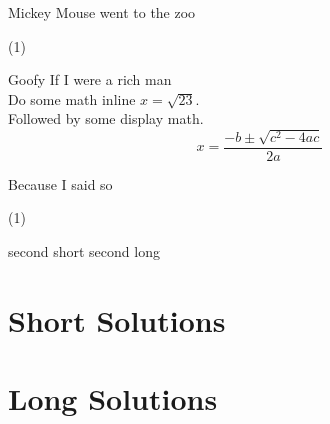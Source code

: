 \documentclass{article}
\makeatletter
\newif\ifshortsolution
\newcommand\shortlongsolution[2]{%
  \ifshortsolution
    \expandafter\@firstoftwo
  \else
    \expandafter\@secondoftwo
  \fi
  {#1}%
  {#2}%
}
\makeatother
\begin{document}
\begin{question}
	Mickey Mouse went to the zoo
\end{question}
\begin{solution}
  \begin{tasks}(1)
    \task \shortlongsolution{
    	Goofy
    	}{
    	If I were a rich man\\
    	Do some math inline $x=\sqrt{23}$.\\
    	Followed by some display math.\\
    	\[x=\frac{-b \pm \sqrt{c^2-4ac}}{2a}\]
    	}
  \end{tasks}
\end{solution}

\begin{question}
	Because I said so
\end{question}

\begin{solution}
  \begin{tasks}(1)
    \task \shortlongsolution{second short}{second long}
  \end{tasks}
\end{solution}

\newpage
\shortsolutiontrue

\section*{Short Solutions}
\printsolutions

\shortsolutionfalse

\section*{Long Solutions}
\printsolutions
\end{document}
